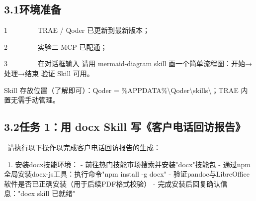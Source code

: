 \documentclass[
  american,
  chinese,
]{ctexart}
\begin{document}
\subsection{\texorpdfstring{\foreignlanguage{american}{3.}\foreignlanguage{american}{1}\foreignlanguage{american}{环境准备}}{3.1环境准备}}\label{ux73afux5883ux51c6ux5907}

\foreignlanguage{american}{{1{~~~~~~~~
}}}\foreignlanguage{american}{TRAE / {Qoder}
}{{\foreignlanguage{american}{已更新到最新版本}}}{\foreignlanguage{american}{；}}

\foreignlanguage{american}{{2{~~~~~~~~
}}}{\foreignlanguage{american}{实验二}}\foreignlanguage{american}{ MCP }{{\foreignlanguage{american}{已配通}}}{\foreignlanguage{american}{；}}

\foreignlanguage{american}{{3{~~~~~~~~
}}}{\foreignlanguage{american}{在对话框输入}}\foreignlanguage{american}{ }{\foreignlanguage{american}{请用}}\foreignlanguage{american}{ mermaid-diagram skill }{\foreignlanguage{american}{画一个简单流程图：开始}\foreignlanguage{american}{→}\foreignlanguage{american}{处理}\foreignlanguage{american}{→}\foreignlanguage{american}{结束}}\foreignlanguage{american}{ }{\foreignlanguage{american}{验证}}\foreignlanguage{american}{ Skill }{\foreignlanguage{american}{可用}}\foreignlanguage{american}{。}

\foreignlanguage{american}{Skill }{\foreignlanguage{american}{存放位置（了解即可}}\foreignlanguage{american}{）：}{\foreignlanguage{american}{Qoder}}\foreignlanguage{american}{ = \%APPDATA\%\textbackslash{}{Qoder}\textbackslash skills\textbackslash{}}\foreignlanguage{american}{；}\foreignlanguage{american}{TRAE }{\foreignlanguage{american}{内置无需手动管理}}\foreignlanguage{american}{。}

\subsection{\texorpdfstring{\foreignlanguage{american}{3.2}{任务}\foreignlanguage{american}{ 1}{：用}\foreignlanguage{american}{ docx Skill }{写《客户电话回访报告》}\foreignlanguage{american}{}}{3.2任务 1：用 docx Skill 写《客户电话回访报告》}}\label{ux4efbux52a1-1ux7528-docx-skill-ux5199ux5ba2ux6237ux7535ux8bddux56deux8bbfux62a5ux544a}

\foreignlanguage{american}{{~}}{请执行以下操作以完成客户电话回访报告的生成：}\foreignlanguage{american}{}

\foreignlanguage{american}{{~}1. }{安装}\foreignlanguage{american}{docx}{技能环境：}\foreignlanguage{american}{ - }{前往热门技能市场搜索并安装}\foreignlanguage{american}{"docx"}{技能包}\foreignlanguage{american}{ - }{通过}{\foreignlanguage{american}{npm}}{全局安装}\foreignlanguage{american}{docx-{js}}{工具：执行命令}\foreignlanguage{american}{"{npm} install -g docx" - }{验证}{\foreignlanguage{american}{pandoc}}{与}\foreignlanguage{american}{LibreOffice}{软件是否已正确安装（用于后续}\foreignlanguage{american}{PDF}{格式校验）}\foreignlanguage{american}{ - }{完成安装后回复确认信息：}\foreignlanguage{american}{"docx
skill }{已就绪}\foreignlanguage{american}{" }
\end{document}
